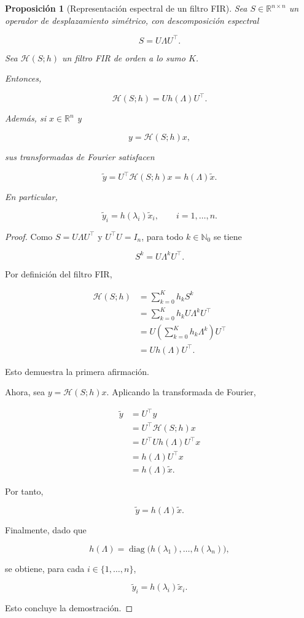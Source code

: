 \documentclass[a4paper,openany,oneside,10pt]{report}
\theoremstyle{pnlTeorema}
\newtheorem{proposicion}{Proposición}[section]
\theoremstyle{pnlDefinicion}
\theoremstyle{pnlObservacion}
\begin{document}
\begin{proposicion}[Representación espectral de un filtro FIR]\label{prop:espectro-fir}
Sea \(S\in\mathbb R^{n\times n}\) un operador de desplazamiento simétrico, con descomposición espectral

\[
S=U\Lambda U^\top.
\]

Sea \(\mathcal H(S;h)\) un filtro FIR de orden a lo sumo \(K\).

Entonces,

\[
\mathcal H(S;h)=Uh(\Lambda)U^\top.
\]

Además, si \(x\in\mathbb R^n\) y

\[
y=\mathcal H(S;h)x,
\]

sus transformadas de Fourier satisfacen

\begin{equation}\label{eq:representacion-espectral}
\widetilde y
=U^\top\mathcal H(S;h)x
=h(\Lambda)\widetilde x.
\end{equation}

En particular,

\[
\widetilde y_i
=h(\lambda_i)\widetilde x_i,
\qquad i=1,\ldots,n.
\]

\end{proposicion}

\begin{proof} Como \(S=U\Lambda U^\top\) y \(U^\top U=I_n\), para todo \(k\in\mathbb N_0\) se tiene

\[
S^k=U\Lambda^kU^\top.
\]

Por definición del filtro FIR,

\[
\begin{aligned}
\mathcal H(S;h)
&=\sum_{k=0}^{K}h_kS^k\\
&=\sum_{k=0}^{K}h_kU\Lambda^kU^\top\\
&=U\left(\sum_{k=0}^{K}h_k\Lambda^k\right)U^\top\\
&=Uh(\Lambda)U^\top.
\end{aligned}
\]

Esto demuestra la primera afirmación.

Ahora, sea \(y=\mathcal H(S;h)x\). Aplicando la transformada de Fourier,

\[
\begin{aligned}
\widetilde y
&=U^\top y\\
&=U^\top\mathcal H(S;h)x\\
&=U^\top Uh(\Lambda)U^\top x\\
&=h(\Lambda)U^\top x\\
&=h(\Lambda)\widetilde x.
\end{aligned}
\]

Por tanto,

\[
\widetilde y=h(\Lambda)\widetilde x.
\]

Finalmente, dado que

\[
h(\Lambda)=
\operatorname{diag}\bigl(
h(\lambda_1),\ldots,h(\lambda_n)
\bigr),
\]

se obtiene, para cada \(i\in\{1,\ldots,n\}\),

\[
\widetilde y_i=h(\lambda_i)\widetilde x_i.
\]

Esto concluye la demostración.
\end{proof}
\end{document}
